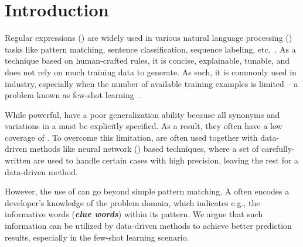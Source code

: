 \section{Introduction}


Regular expressions (\REs) are widely used in various natural language processing (\NLP) tasks like pattern matching, sentence
classification, sequence labeling, etc.~\cite{chang2014tokensregex}.
As a technique based on human-crafted rules, it is concise, explainable, tunable, and does not rely on much training data to generate. As
such, it is commonly used in industry, especially when the number of available training examples is limited -- a problem known as few-shot
learning~\cite{gc2015big}.

While powerful, \REs have a poor generalization ability because all synonyms and variations in a \RE must be explicitly specified. As a
result, they often have a low coverage of . To overcome this limitation, \REs are often used together with
data-driven methods like neural network (\NN) based techniques, where a set of carefully-written \REs are used to handle certain cases with
high precision, leaving the rest for a data-driven method.

However, the use of \REs can go beyond simple pattern matching.
A \RE often encodes a developer's knowledge of the problem domain, which indicates e.g., the informative words (\textbf{\textit{clue
words}}) within its pattern.
We argue that such information can be utilized by data-driven methods to achieve better prediction results, especially in the few-shot
learning scenario.





